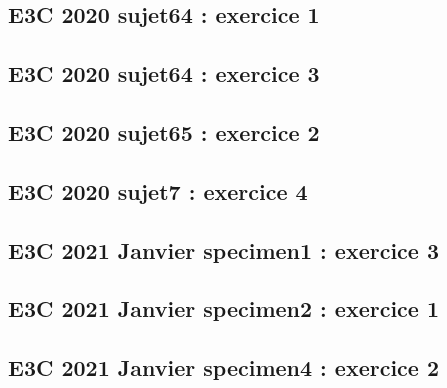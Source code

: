 \documentclass[lang=fr,edition=teacher,layout=sheet]{mxbook}
\begin{document}
\subsection*{E3C 2020 sujet64 : exercice 1}
\begingroup\endgroup
\par\bigskip
{}\subsection*{E3C 2020 sujet64 : exercice 3}
\begingroup\endgroup
\par\bigskip
{}\subsection*{E3C 2020 sujet65 : exercice 2}
\begingroup\endgroup
\par\bigskip
{}\subsection*{E3C 2020 sujet7 : exercice 4}
\begingroup\endgroup
\par\bigskip
{}\subsection*{E3C 2021 Janvier specimen1 : exercice 3}
\begingroup\endgroup
\par\bigskip
{}\subsection*{E3C 2021 Janvier specimen2 : exercice 1}
\begingroup\endgroup
\par\bigskip
{}\subsection*{E3C 2021 Janvier specimen4 : exercice 2}
\begingroup\endgroup
\par\bigskip
\end{document}
